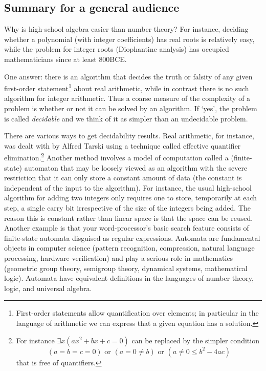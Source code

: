 \documentclass[12pt]{article}
\theoremstyle{plain} \numberwithin{equation}{section}
\theoremstyle{definition}
\def\tit#1{\subsection*{#1}}
\begin{document}
\thispagestyle{fancy}


\tit{Summary for a general audience}

Why is high-school algebra easier than number theory? For instance, deciding whether a polynomial (with integer coefficients) has real roots is relatively easy, while the problem for integer roots (Diophantine analysis) has occupied mathematicians since at least 800BCE.

One answer: there is an algorithm that decides the truth or falsity of any given first-order statement\footnote{First-order statements allow quantification over elements; in particular in the language of arithmetic we can express that a given equation has a solution.} about real arithmetic, while in contrast there is no such algorithm for integer arithmetic. Thus a coarse measure of the complexity of a problem is whether or not it can be solved by an algorithm. If `yes', the problem is called {\em decidable} and we think of it as simpler than an undecidable problem.

There are various ways to get decidability results. Real arithmetic, for instance, was dealt with by Alfred Tarski using a technique called effective quantifier elimination.\footnote{For instance
$
\exists x (ax^2 + bx + c = 0)
$
can be replaced by the simpler condition
\[
(a = b = c = 0) \textrm{ or } (a = 0 \neq b) \textrm{ or }  (a \neq 0 \leq b^2 - 4ac)
\]
that is free of quantifiers.} Another method involves a model of computation called a (finite-state) automaton that may be loosely viewed as an algorithm with the severe restriction that it can only store a constant amount of data (the constant is independent of the input to the algorithm). For instance, the usual high-school algorithm for adding two integers only requires one to store, temporarily at each step, a single carry bit irrespective of the size of the integers being added. The reason this is constant rather than linear space is that the space can be reused. 
Another example is that your word-processor's basic search feature consists of finite-state automata disguised as regular expressions. Automata are fundamental objects in computer science (pattern recognition, compression, natural language processing, hardware verification) and play a serious role in mathematics (geometric group theory, semigroup theory, dynamical systems, mathematical logic). Automata have equivalent definitions in the languages of number theory, logic, and universal algebra.
\end{document}
